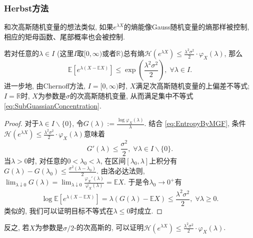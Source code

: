 \subsubsection{Herbst方法}

和次高斯随机变量的想法类似, 如果$e^{\lambda X}$的熵能像Gauss随机变量的熵那样被控制, 相应的矩母函数、尾部概率也会被控制.
\begin{theorem}[Herbst方法]\label{thm:HerbstArgument}
	若对任意的$\lambda \in I$ (这里$I$取$[0, \infty)$或者$\mathbb{R}$)总有熵$\mathcal{H}(e^{\lambda X}) \leq \frac{\lambda^2 \sigma^2}{2} \cdot \varphi_X(\lambda)$, 那么
	\begin{equation*}
		\mathbb{E}\left[e^{\lambda(X - \mathbb{E}X)}\right] 
		\leq \exp \left( \frac{\lambda^2 \sigma^2}{2} \right),\; 
		\forall \lambda \in I. 
	\end{equation*}
	进一步地, 由Chernoff方法, $I = [0, \infty)$时, $X$满足次高斯随机变量的上偏差不等式; $I = \mathbb{R}$时, $X$为参数是$\sigma$的次高斯随机变量, 从而满足集中不等式 \eqref{eq:SubGuassianConcentration}.
\end{theorem}
\begin{proof}
	对于$\lambda \in I \backslash \{0\}$, 令$G(\lambda) := \frac{\log \varphi_X(\lambda)}{\lambda}$. 
	结合 \eqref{eq:EntropyByMGF}, 条件$\mathcal{H}(e^{\lambda X}) \leq \frac{\lambda^2 \sigma^2}{2} \cdot \varphi_X(\lambda)$意味着
	\begin{equation*}
		G'(\lambda) \leq \frac{\sigma^2}{2},\; \forall \lambda \in I \backslash \{0\}. 
	\end{equation*}
	当$\lambda > 0$时, 对任意的$0 < \lambda_0 < \lambda$, 在区间$[\lambda_0, \lambda]$上积分有$G(\lambda) - G(\lambda_0) \leq \frac{\sigma^2 (\lambda - \lambda_0)}{2}$. 
	由洛必达法则, $ \lim_{\lambda \downarrow 0} G(\lambda) = \lim_{\lambda \downarrow 0} \frac{\varphi_X'(\lambda)}{\varphi_X(\lambda)} = \mathbb{E}X$. 
	于是令$\lambda_0 \to 0^+$有
	\begin{equation*}
		\log \mathbb{E}\left[e^{\lambda(X - \mathbb{E}X)}\right]
		= \lambda(G(\lambda) - \mathbb{E}X)
		\leq \frac{\lambda^2 \sigma^2}{2} ,\; 
		\forall \lambda \geq 0. 
	\end{equation*}
	类似的, 我们可以证明目标不等式在$\lambda \leq 0$时成立. 
\end{proof}

\begin{remark}
	反之, 若$X$为参数是$\sigma/2$-的次高斯的, 可以证明$\mathcal{H}(e^{\lambda X}) \leq \frac{\lambda^2 \sigma^2}{2} \cdot \varphi_X(\lambda)$. 
\end{remark}

